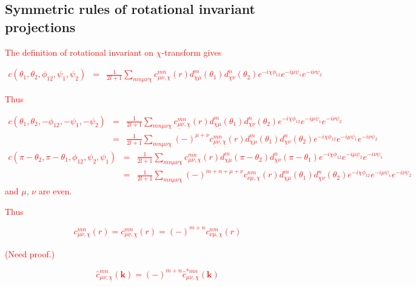 \subsection{Symmetric rules of rotational invariant projections}

\textcolor{red}{The definition of rotational invariant on $\chi$-transform
gives}

\textcolor{red}{
\begin{eqnarray*}
c(\theta_{1},\theta_{2},\phi_{12},\psi_{1},\psi_{2}) & = & \frac{1}{2l+1}\sum_{mn\mu\nu\chi}c_{\mu\nu,\chi}^{mn}(r)d_{\chi\mu}^{m}(\theta_{1})d_{\underline{\chi}\nu}^{n}(\theta_{2})e^{-i\chi\phi_{12}}e^{-i\mu\psi_{1}}e^{-i\nu\psi_{2}}
\end{eqnarray*}
}

\textcolor{red}{Thus}

\textcolor{red}{
\begin{eqnarray*}
c(\theta_{1},\theta_{2},-\phi_{12},-\psi_{1},-\psi_{2}) & = & \frac{1}{2l+1}\sum_{mn\mu\nu\chi}c_{\underline{\mu}\underline{\nu},\underline{\chi}}^{mn}(r)d_{\underline{\chi}\underline{\mu}}^{m}(\theta_{1})d_{\chi\underline{\nu}}^{n}(\theta_{2})e^{-i\chi\phi_{12}}e^{-i\mu\psi_{1}}e^{-i\nu\psi_{2}}\\
 & = & \frac{1}{2l+1}\sum_{mn\mu\nu\chi}\left(-\right)^{\mu+\nu}c_{\underline{\mu}\underline{\nu},\underline{\chi}}^{mn}(r)d_{\chi\mu}^{m}(\theta_{1})d_{\underline{\chi}\nu}^{n}(\theta_{2})e^{-i\chi\phi_{12}}e^{-i\mu\psi_{1}}e^{-i\nu\psi_{2}}
\end{eqnarray*}
\begin{eqnarray*}
c(\pi-\theta_{2},\pi-\theta_{1},\phi_{12},\psi_{2},\psi_{1}) & = & \frac{1}{2l+1}\sum_{mn\mu\nu\chi}c_{\mu\nu,\chi}^{mn}(r)d_{\chi\mu}^{m}(\pi-\theta_{2})d_{\underline{\chi}\nu}^{n}(\pi-\theta_{1})e^{-i\chi\phi_{12}}e^{-i\mu\psi_{2}}e^{-i\nu\psi_{1}}\\
 & = & \frac{1}{2l+1}\sum_{mn\mu\nu\chi}\left(-\right)^{m+n+\mu+\nu}c_{\nu\mu,\chi}^{nm}(r)d_{\chi\mu}^{m}(\theta_{1})d_{\underline{\chi}\nu}^{n}(\theta_{2})e^{-i\chi\phi_{12}}e^{-i\mu\psi_{1}}e^{-i\nu\psi_{2}}
\end{eqnarray*}
and $\mu$, $\nu$ are even.}

\textcolor{red}{Thus}

\textcolor{red}{
\[
c_{\mu\nu,\chi}^{mn}(r)=c_{\underline{\mu}\underline{\nu},\underline{\chi}}^{mn}(r)=\left(-\right)^{m+n}c_{\nu\mu,\chi}^{nm}(r)
\]
}

\textcolor{red}{(Need proof.)}

\textcolor{red}{
\[
\hat{c}_{\mu\nu,\underline{\chi}}^{mn}(\mathbf{k})=\left(-\right)^{m+n}\hat{c}_{\mu\nu,\chi}^{*mn}(\mathbf{k})
\]
}

